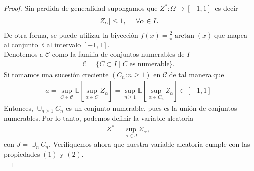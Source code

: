 \begin{proof}
Sin perdida de generalidad supongamos que $Z^{*} : \Omega \rightarrow [-1, 1]$, es decir
	\begin{align*}
	|Z_\alpha| \leq 1, \hspace{0.5cm} \forall \alpha \in I.
	\end{align*}
De otra forma, se puede utilizar la biyección $f(x) = \frac{2}{\pi} \arctan(x)$ que mapea al conjunto $\mathbb{R}$ al intervalo $[-1, 1]$. \\

\noindent Denotemos a $\mathcal{C}$ como la familia de conjuntos numerables de $I$
	\begin{align*}
	\mathcal{C} = \{C \subset I \mid C \text{ es numerable}\}.
	\end{align*}
Si tomamos una sucesión creciente $(C_n : n \geq 1)$ en $\mathcal{C}$ de tal manera que
	\begin{align*}
	a = \sup_{C \in \mathcal{C}} \mathbb{E} \left[ \sup_{\alpha \in C} Z_{\alpha} \right] = \sup_{n \geq 1} \mathbb{E} \left[ \sup_{\alpha \in C_n} Z_{\alpha} \right] \in [-1, 1]
	\end{align*}
Entonces, $\cup_{n \geq 1} C_n$ es un conjunto numerable, pues es la unión de conjuntos numerables. Por lo tanto, podemos definir la variable aleatoria
	\begin{align*}
	Z^{*} = \sup_{\alpha \in J} Z_\alpha,
	\end{align*}
con $J = \cup_n C_n$. Verifiquemos ahora que nuestra variable aleatoria cumple con las propiedades $(1)$ y $(2)$. \\


\end{proof}
